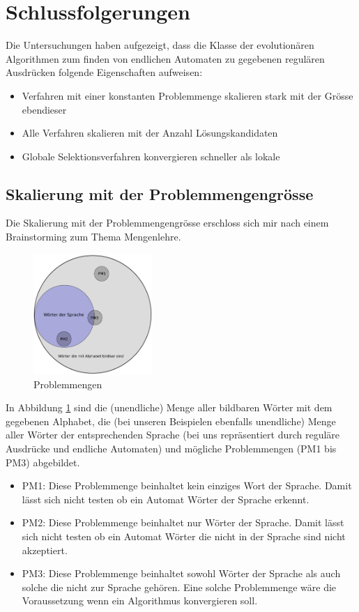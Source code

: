 \section{Schlussfolgerungen}
Die Untersuchungen haben aufgezeigt, dass die Klasse der evolutionären Algorithmen zum finden von endlichen Automaten zu gegebenen regulären Ausdrücken folgende Eigenschaften aufweisen:
\begin{itemize}
	\item Verfahren mit einer konstanten Problemmenge skalieren stark mit der Grösse ebendieser
	\item Alle Verfahren skalieren mit der Anzahl Lösungskandidaten
	\item Globale Selektionsverfahren konvergieren schneller als lokale
\end{itemize}

\subsection{Skalierung mit der Problemmengengrösse}
Die Skalierung mit der Problemmengengrösse erschloss sich mir nach einem Brainstorming zum Thema Mengenlehre.

\begin{figure}[h]
  \centering
  \includegraphics[width=0.4\textwidth]{images/problemmengen.pdf}
  \caption[Problemmengen]{Problemmengen}
  \label{fig:problemmengen}
\end{figure}

In Abbildung \ref{fig:problemmengen} sind die (unendliche) Menge aller bildbaren Wörter mit dem gegebenen Alphabet, die (bei unseren Beispielen ebenfalls unendliche) Menge aller Wörter der entsprechenden Sprache (bei uns repräsentiert durch reguläre Ausdrücke und endliche Automaten) und mögliche Problemmengen (PM1 bis PM3) abgebildet.
\begin{itemize}
	\item PM1: Diese Problemmenge beinhaltet kein einziges Wort der Sprache. Damit lässt sich nicht testen ob ein Automat Wörter der Sprache erkennt.
	\item PM2: Diese Problemmenge beinhaltet nur Wörter der Sprache. Damit lässt sich nicht testen ob ein Automat Wörter die nicht in der Sprache sind nicht akzeptiert.
	\item PM3: Diese Problemmenge beinhaltet sowohl Wörter der Sprache als auch solche die nicht zur Sprache gehören. Eine solche Problemmenge wäre die Voraussetzung wenn ein Algorithmus konvergieren soll.
\end{itemize}

